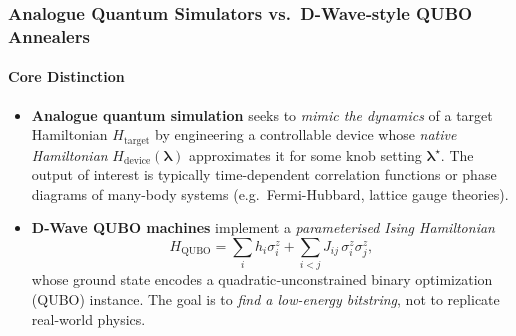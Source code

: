 \documentclass[11pt,a4paper]{article}
\begin{document}
\subsubsection{Analogue Quantum Simulators vs.\ D-Wave‐style QUBO Annealers}

\paragraph{Core Distinction}
\begin{itemize}
	\item \textbf{Analogue quantum simulation} seeks to \emph{mimic the dynamics} of a target Hamiltonian $H_{\text{target}}$ by engineering a controllable device whose \emph{native Hamiltonian} $H_{\text{device}}(\boldsymbol{\lambda})$ approximates it for some knob setting $\boldsymbol{\lambda}^\star$.  The output of interest is typically time-dependent correlation functions or phase diagrams of many-body systems (e.g.\ Fermi-Hubbard, lattice gauge theories).
	\item \textbf{D-Wave QUBO machines} implement a \emph{parameterised Ising Hamiltonian}
	\[
	H_{\text{QUBO}} = \sum_i h_i \sigma_i^z + \sum_{i<j} J_{ij}\,\sigma_i^z\sigma_j^z,
	\]
	whose ground state encodes a quadratic‐unconstrained binary optimization (QUBO) instance.  The goal is to \emph{find a low-energy bitstring}, not to replicate real-world physics.
\end{itemize}
\end{document}
